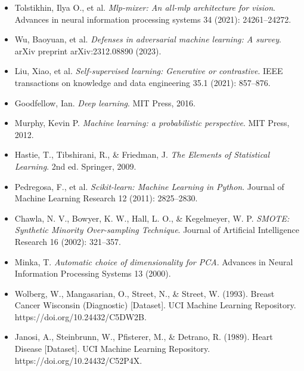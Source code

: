 \begin{itemize}
    \item Tolstikhin, Ilya O., et al. \textit{Mlp-mixer: An all-mlp
              architecture for vision}. Advances in neural information
          processing systems 34 (2021): 24261--24272.
    \item Wu, Baoyuan, et al. \textit{Defenses in adversarial machine
              learning: A survey}. arXiv preprint arXiv:2312.08890 (2023).
    \item Liu, Xiao, et al. \textit{Self-supervised learning: Generative or
              contrastive}. IEEE transactions on knowledge and data
          engineering 35.1 (2021): 857--876.
    \item Goodfellow, Ian. \textit{Deep learning}. MIT Press, 2016.
    \item Murphy, Kevin P. \textit{Machine learning: a probabilistic
              perspective}. MIT Press, 2012.
    \item Hastie, T., Tibshirani, R., \& Friedman, J. \textit{The Elements
              of Statistical Learning}. 2nd ed. Springer, 2009.
    \item Pedregosa, F., et al. \textit{Scikit-learn: Machine Learning in
              Python}. Journal of Machine Learning Research 12 (2011):
          2825--2830.
    \item Chawla, N. V., Bowyer, K. W., Hall, L. O., \& Kegelmeyer, W. P.
          \textit{SMOTE: Synthetic Minority Over-sampling Technique}.
          Journal of Artificial Intelligence Research 16 (2002): 321--357.
    \item Minka, T. \textit{Automatic choice of dimensionality for PCA}.
          Advances in Neural Information Processing Systems 13 (2000).
    \item Wolberg, W., Mangasarian, O., Street, N., \& Street, W. (1993).
          Breast Cancer Wisconsin (Diagnostic) [Dataset]. UCI Machine
          Learning Repository. \\
          https://doi.org/10.24432/C5DW2B.
    \item Janosi, A., Steinbrunn, W., Pfisterer, M., \& Detrano, R. (1989).
          Heart Disease [Dataset]. UCI Machine Learning Repository. \\
          https://doi.org/10.24432/C52P4X.
\end{itemize}

